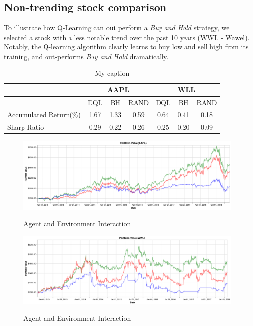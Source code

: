 \documentclass[12pt, authoryear]{elsarticle}
\begin{document}
\subsection{Non-trending stock comparison}

To illustrate how Q-Learning can out perform a \textit{Buy and Hold} strategy, we selected a stock with a less notable trend over the past 10 years (WWL - Wawel). Notably, the Q-learning algorithm clearly learns to buy low and sell high from its training, and out-performs \textit{Buy and Hold} dramatically.

\begin{table}[h!]
	\centering
	\caption{My caption}
	\label{my-label}
	\begin{tabular}{lcccccc} \\ \hline\hline
		& \multicolumn{3}{c}{AAPL} & \multicolumn{3}{c}{WLL} \\ \hline
		& DQL & BH & RAND & DQL & BH & RAND \\ \hline
		Accumulated Return(\%) & 1.67 & 1.33 & 0.59 & 0.64 & 0.41 & 0.18 \\
		Sharp Ratio & 0.29 & 0.22 & 0.26 & 0.25 & 0.20 & 0.09 \\\hline\hline
	\end{tabular}
\end{table}


\begin{figure}[h!]
	\centering
	\caption{Agent and Environment Interaction}
	\includegraphics[width=\linewidth]{figures/aapl_portfolio.png}
	\label{fig:1}
\end{figure}


\begin{figure}[h!]
	\centering
	\caption{Agent and Environment Interaction}
	\includegraphics[width=\linewidth]{figures/wwl_portfolio.png}
	\label{fig:1}
\end{figure}
\end{document}
